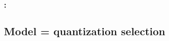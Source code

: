 \documentclass[english,xcolor={rgb,dvipsnames,table,usenames}]{beamer}
\newcommand\q{{\bm{q}}}
\begin{document}
\begin{frame}
\frametitle{\secname: \subsecname}



%        
%    
%        
%    

\end{frame}



\newlength\figureheight
\newlength\figurewidth
\setlength\figureheight{8cm}
\setlength\figurewidth{11cm}
 
\begin{frame}
\frametitle{\secname}

\begin{figure}
\begin{animateinline}[poster=first, controls, palindrome, buttonfg=white]{3}
%
\end{animateinline}
\end{figure}

\end{frame}



\subsection{Model = quantization selection}
\end{document}
